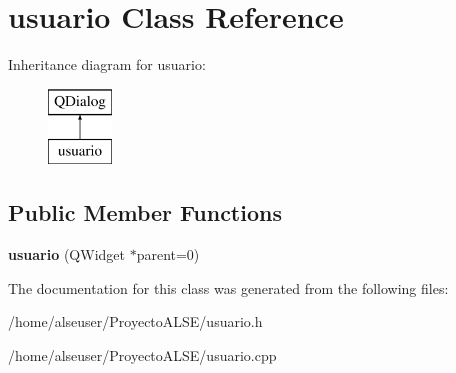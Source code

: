 \hypertarget{classusuario}{}\section{usuario Class Reference}
\label{classusuario}
Inheritance diagram for usuario\+:\begin{figure}[H]
\begin{center}
\leavevmode
\includegraphics[height=2.000000cm]{classusuario}
\end{center}
\end{figure}
\subsection*{Public Member Functions}
\begin{DoxyCompactItemize}
\item 
\mbox{\label{classusuario_a34821186e90424c9105221fb931e9ca0}} 
{\bfseries usuario} (Q\+Widget $\ast$parent=0)
\end{DoxyCompactItemize}


The documentation for this class was generated from the following files\+:\begin{DoxyCompactItemize}
\item 
/home/alseuser/\+Proyecto\+A\+L\+S\+E/usuario.\+h\item 
/home/alseuser/\+Proyecto\+A\+L\+S\+E/usuario.\+cpp\end{DoxyCompactItemize}
